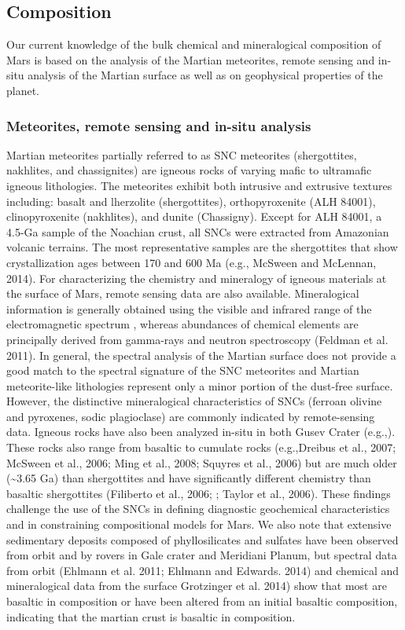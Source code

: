 \subsection{Composition}
Our current knowledge of the bulk chemical and mineralogical composition of Mars is based on the analysis of the Martian meteorites, remote sensing and in-situ analysis of the Martian surface as well as on geophysical properties of the planet.   

\subsubsection{Meteorites, remote sensing and in-situ analysis}
Martian meteorites partially referred to as SNC meteorites (shergottites, nakhlites, and chassignites) are igneous rocks of varying mafic to ultramafic igneous lithologies. The meteorites exhibit both intrusive and extrusive textures including: basalt and lherzolite (shergottites), orthopyroxenite (ALH 84001), clinopyroxenite (nakhlites), and dunite (Chassigny). Except for ALH 84001, a 4.5-Ga sample of the Noachian crust, all SNCs were extracted from Amazonian volcanic terrains. The most representative samples are the shergottites that show crystallization ages between 170 and 600 Ma (e.g., McSween and McLennan, 2014).  For characterizing the chemistry and mineralogy of igneous materials at the surface of Mars, remote sensing data are also available. Mineralogical information is generally obtained using the visible and infrared range of the electromagnetic spectrum \citep{Bandfield2000, Poulet2009}, whereas abundances of chemical elements are principally derived from gamma-rays \citep{Boynton2007} and neutron spectroscopy (Feldman et al. 2011). In general, the spectral analysis of the Martian surface does not provide a good match to the spectral signature of the SNC meteorites \cite{HAMILTON2003, Lang2009} and Martian meteorite-like lithologies represent only a minor portion of the dust-free surface. However, the distinctive mineralogical characteristics of SNCs (ferroan olivine and pyroxenes, sodic plagioclase) are commonly indicated by remote-sensing data. Igneous rocks have also been analyzed in-situ in both Gusev Crater (e.g.,\cite{Squyres2004}). These rocks also range from basaltic to cumulate rocks (e.g.,Dreibus et al., 2007; McSween et al., 2006; Ming et al., 2008; Squyres et al., 2006) but are much older (\textasciitilde 3.65 Ga) than shergottites \citep{Arvidson, Greeley2005} and have significantly different chemistry than basaltic shergottites (Filiberto et al., 2006; \citep{McSween2009}; Taylor et al., 2006). These findings challenge the use of the SNCs in defining diagnostic geochemical characteristics and in constraining compositional models for Mars. We also note that extensive sedimentary deposits composed of phyllosilicates and sulfates have been observed from orbit and by rovers in Gale crater and Meridiani Planum, but spectral data from orbit (Ehlmann et al. 2011; Ehlmann and Edwards. 2014) and chemical and mineralogical data from the surface \cite{DavisA.M.McSweenH.Y.Jr.&McLennan2005} Grotzinger et al. 2014) show that most are basaltic in composition or have been altered from an initial basaltic composition, indicating that the martian crust is basaltic in composition.

